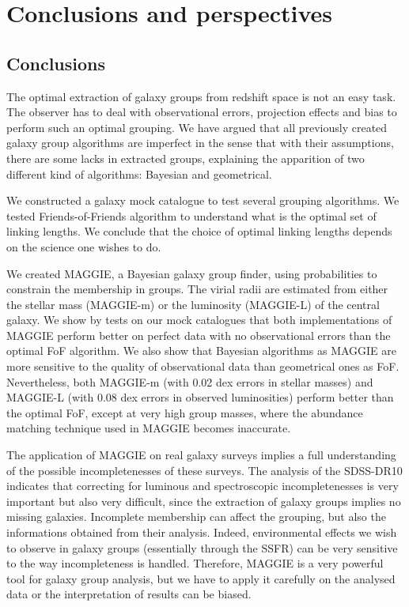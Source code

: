 \chapter{Conclusions and perspectives}
\label{cha:conclusions_and_perspectives}

\section{Conclusions}
\label{sec:conclusions}

The optimal extraction of galaxy groups from redshift space is not an easy
task. The observer has to deal with observational errors, projection
effects and bias to perform such an optimal grouping. We have argued that all
previously created galaxy group algorithms are imperfect in the sense that with
their assumptions, there are some lacks in extracted groups, explaining the
apparition of two different kind of algorithms: Bayesian and geometrical.

We constructed a galaxy mock catalogue to test several grouping algorithms. We
tested Friends-of-Friends algorithm to understand what is the optimal set of
linking lengths. We conclude that the choice of optimal linking lengths depends
on the science one wishes to do.

We created  MAGGIE, a Bayesian galaxy group finder, using probabilities to
constrain the membership in groups. The virial radii are estimated from either
the stellar mass (MAGGIE-m) or the luminosity (MAGGIE-L) of the central galaxy.
We show by tests on our mock catalogues that both implementations of MAGGIE
perform better on perfect data with no observational errors than the optimal
FoF algorithm. We also show that Bayesian algorithms as MAGGIE are more
sensitive to the quality of observational data than geometrical ones as FoF.
Nevertheless, both MAGGIE-m (with 0.02 dex errors in stellar masses) and
MAGGIE-L (with 0.08 dex errors in observed luminosities) perform better than
the optimal FoF, except at very high group masses, where the abundance matching
technique used in MAGGIE becomes inaccurate.

The application of MAGGIE on real galaxy surveys implies a full understanding
of the possible incompletenesses of these surveys. The analysis of the
SDSS-DR10 indicates that correcting for luminous and spectroscopic
incompletenesses is very important but also very difficult, since the
extraction of galaxy groups implies no missing galaxies. Incomplete membership
can affect the grouping, but also the informations obtained from their
analysis. Indeed, environmental effects we wish to observe in galaxy groups
(essentially through the SSFR) can be very sensitive to the way incompleteness
is handled. Therefore, MAGGIE is a very powerful tool for galaxy group analysis, but we have
to apply it carefully on the analysed data or the interpretation of results can
be biased.

